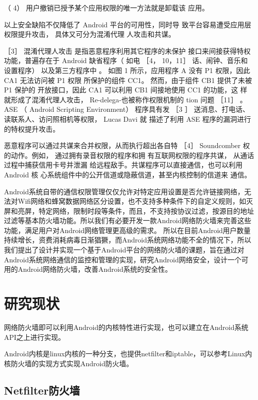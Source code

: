 \documentclass{article}
\begin{document}
（ 4） 用户撤销已授予某个应用权限的唯一方法就是卸载该 应用。

以上安全缺陷不仅降低了 Android 平台的可用性，同时导 致平台容易遭受应用层权限提升攻击， 具体又可分为混淆代理 人攻击和共谋。

［3］ 混淆代理人攻击 是指恶意程序利用其它程序的未保护 接口来间接获得特权功能，普遍存在于 Android 缺省程序（ 如电 ［4， 10，11］ 话、闹钟、音乐和设置程序） 以及第三方程序中 。 如图 1 所示，应用程序 A 没有 P1 权限，因此 CA1 无法访问被 P1 权限 所保护的组件 CC1。 然而，由于组件 CB1 提供了未被 P1 保护的 开放接口，因此 CA1 可以利用 CB1 间接地使用 CC1 的功能，这 样就形成了混淆代理人攻击， Re-delega-也被称作权限机制的 tion 问题 ［11］ 。ASE （ Android Scripting Environment） 程序具有发 ［3 ］ 送消息、打电话、读联系人、访问照相机等权限， Lucas Davi 就 描述了利用 ASE 程序的漏洞进行的特权提升攻击。

恶意程序可以通过共谋来合并权限，从而执行超出各自特 ［4］ Soundcomber 权的动作。例如， 通过拥有录音权限的程序和拥 有互联网权限的程序共谋， 从通话过程中捕获信用卡号并泄漏 给远程敌手。共谋程序可以直接通信，也可以利用 Android 核 心系统组件中的公开信道或隐蔽信道，甚至内核控制的信道来 通信。




Android系统自带的通信权限管理仅仅允许对特定应用设置是否允许链接网络，无法对Wifi网络和蜂窝数据网络区分设置，也不支持多种条件下的自定义规则，如灭屏和亮屏，特定网络，限制时段等条件，而且，不支持按协议过滤，按源目的地址过滤等基本防火墙功能。所以我们有必要开发一款Android网络防火墙来完善这些功能，满足用户对Android网络管理更高级的需求。
所以在目前Android用户数量持续增长，资费消耗病毒日渐猖獗，而Android系统网络功能不全的情况下，所以我们提出了设计并实现一个基于Android平台的网络防火墙的课题，旨在通过对Android系统网络通信的监控和管理的实现，研究Android网络安全，设计一个可用的Android网络防火墙，改善Android系统的安全性。



\section{研究现状}
网络防火墙即可以利用Android的内核特性进行实现，也可以建立在Android系统API之上进行实现。


Android内核是linux内核的一种分支，也提供netfilter和iptable，可以参考Linux内核防火墙的实现方式实现Android防火墙。

\subsection{Netfilter防火墙}
\end{document}
